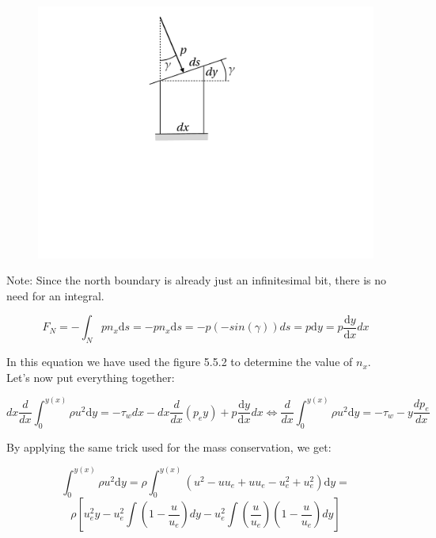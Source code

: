 \begin{figure}
\begin{center}
\includegraphics[scale=0.45]{ch5/17} 
\end{center}
\end{figure}

Note: Since the north boundary is already just an infinitesimal bit, there is no need for an integral.

\begin{equation}
\newcommand{\deriv}{\mathrm{d}}
F_N=- \int_N p n_x \deriv s =-pn_x \deriv s=-p(-sin(\gamma))ds=p \deriv y=p \frac{\deriv y}{\deriv x} dx
\end{equation}

In this equation we have used the figure 5.5.2 to determine the value of $n_x$.
\\

Let's now put everything together:

\begin{equation}
\newcommand{\deriv}{\mathrm{d}}
dx \frac{d}{dx} \int_{0}^{y(x)} \rho u^2 \deriv y=-\tau_w dx-dx \frac{d}{dx}(p_ey)+p \frac{\deriv y}{\deriv x} dx \Leftrightarrow  \frac{d}{dx} \int_{0}^{y(x)} \rho u^2 \deriv y=-\tau_w - y\frac{dp_e}{dx}
\end{equation}

By applying the same trick used for the mass conservation, we get:

\begin{equation}
\newcommand{\deriv}{\mathrm{d}}
\int_{0}^{y(x)} \rho u^2 \deriv y=\rho \int_{0}^{y(x)}  (u^2-uu_e+uu_e-u_e^2+u_e^2) \deriv y=
\end{equation}
\begin{equation}
\newcommand{\deriv}{\mathrm{d}}
\rho [u_e^2y-u_e^2 \int (1-\frac{u}{u_e})dy-u_e^2 \int (\frac{u}{u_e})(1-\frac{u}{u_e})dy]
\end{equation}


